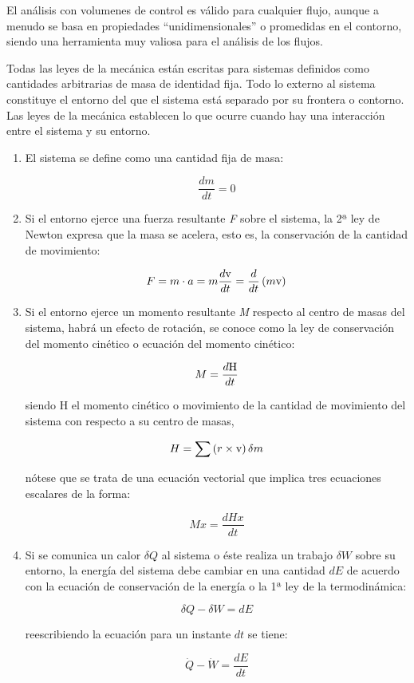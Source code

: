 El análisis con volumenes de control es válido para cualquier flujo,
aunque a menudo se basa en propiedades ``unidimensionales'' o promedidas
en el contorno, siendo una herramienta muy valiosa para el análisis de
los flujos.

Todas las leyes de la mecánica están escritas para sistemas definidos
como cantidades arbitrarias de masa de identidad fija. Todo lo externo
al sistema constituye el entorno del que el sistema está separado por su
frontera o contorno. Las leyes de la mecánica establecen lo que ocurre
cuando hay una interacción entre el sistema y su entorno.

\begin{enumerate}
\def\labelenumi{\arabic{enumi}.}
\item
  El sistema se define como una cantidad fija de masa:

  \[\frac {dm}{dt}=0\]
\item
  Si el entorno ejerce una fuerza resultante \emph{F} sobre el sistema,
  la 2ª ley de Newton expresa que la masa se acelera, esto es, la
  conservación de la cantidad de movimiento:

  \[F=m \cdot a= m \frac {d\text v}{dt}= \frac {d}{dt} \left( m \text v\right)\]
\item
  Si el entorno ejerce un momento resultante \emph{M} respecto al centro
  de masas del sistema, habrá un efecto de rotación, se conoce como la
  ley de conservación del momento cinético o ecuación del momento
  cinético:

  \[M= \frac {d \text H}{dt}\]

  siendo H el momento cinético o movimiento de la cantidad de movimiento
  del sistema con respecto a su centro de masas,

  \[H= \sum \left(r\times \text v \right) \delta m\]

  nótese que se trata de una ecuación vectorial que implica tres
  ecuaciones escalares de la forma:

  \[Mx=\frac{dHx}{dt}\]
\item
  Si se comunica un calor \(\delta Q\) al sistema o éste realiza un
  trabajo \(\delta W\) sobre su entorno, la energía del sistema debe
  cambiar en una cantidad \(dE\) de acuerdo con la ecuación de
  conservación de la energía o la 1ª ley de la termodinámica:

  \[\delta Q- \delta W = d E\]

  reescribiendo la ecuación para un instante \(dt\) se tiene:

  \[\dot{Q}-\dot{W}=\frac {dE}{dt}\]
\end{enumerate}

